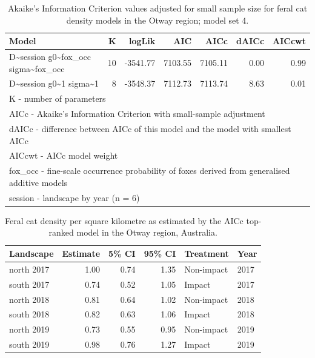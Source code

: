 \documentclass[]{elsarticle} %
\begin{document}
\begingroup\fontsize{10}{12}\selectfont

\begin{longtable}[t]{lrrrrrr}
\caption{\label{tab:density-aic-o-4}Akaike's Information Criterion values adjusted for small sample size for feral cat density models in the Otway region; model set 4.}\\
\toprule
Model & K & logLik & AIC & AICc & dAICc & AICcwt\\
\midrule
D\textasciitilde{}session g0\textasciitilde{}fox\_occ sigma\textasciitilde{}fox\_occ & 10 & -3541.77 & 7103.55 & 7105.11 & 0.00 & 0.99\\
D\textasciitilde{}session g0\textasciitilde{}1 sigma\textasciitilde{}1 & 8 & -3548.37 & 7112.73 & 7113.74 & 8.63 & 0.01\\
\bottomrule
\multicolumn{7}{l}{\rule{0pt}{1em}K - number of parameters}\\
\multicolumn{7}{l}{\rule{0pt}{1em}AICc - Akaike's Information Criterion with small-sample adjustment}\\
\multicolumn{7}{l}{\rule{0pt}{1em}dAICc - difference between AICc of this model and the model with smallest AICc}\\
\multicolumn{7}{l}{\rule{0pt}{1em}AICcwt - AICc model weight}\\
\multicolumn{7}{l}{\rule{0pt}{1em}fox\_occ - fine-scale occurrence probability of foxes derived from generalised additive models}\\
\multicolumn{7}{l}{\rule{0pt}{1em}session - landscape by year (n = 6)}\\
\end{longtable}
\endgroup{}

\newpage

\begingroup\fontsize{10}{12}\selectfont

\begin{longtable}[t]{lrrrll}
\caption{\label{tab:density-aic-o-5}Feral cat density per square kilometre as estimated by the AICc top-ranked model in the Otway region, Australia.}\\
\toprule
Landscape & Estimate & 5\% CI & 95\% CI & Treatment & Year\\
\midrule
north 2017 & 1.00 & 0.74 & 1.35 & Non-impact & 2017\\
south 2017 & 0.74 & 0.52 & 1.05 & Impact & 2017\\
north 2018 & 0.81 & 0.64 & 1.02 & Non-impact & 2018\\
south 2018 & 0.82 & 0.63 & 1.06 & Impact & 2018\\
north 2019 & 0.73 & 0.55 & 0.95 & Non-impact & 2019\\
\addlinespace
south 2019 & 0.98 & 0.76 & 1.27 & Impact & 2019\\
\bottomrule
\end{longtable}
\endgroup{}
\end{document}
